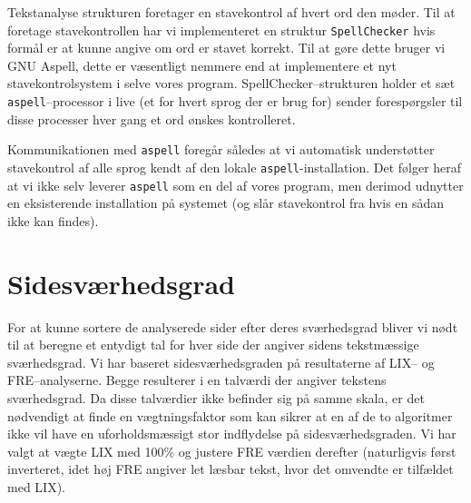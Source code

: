 \documentclass[a4paper,oneside]{memoir}
\begin{document}
Tekstanalyse strukturen foretager en stavekontrol af hvert ord den
møder. Til at foretage stavekontrollen har vi implementeret en
struktur \texttt{SpellChecker} hvis formål er at kunne angive om ord
er stavet korrekt. Til at gøre dette bruger vi GNU Aspell, dette er
væsentligt nemmere end at implementere et nyt stavekontrolsystem i
selve vores program. SpellChecker--strukturen holder et sæt
\texttt{aspell}--processor i live (et for hvert sprog der er brug for)
sender forespørgsler til disse processer hver gang et ord ønskes
kontrolleret.

Kommunikationen med \texttt{aspell} foregår således at
vi automatisk understøtter stavekontrol af alle sprog kendt af den
lokale \texttt{aspell}-installation. Det følger heraf at vi ikke selv
leverer \texttt{aspell} som en del af vores program, men derimod
udnytter en eksisterende installation på systemet (og slår
stavekontrol fra hvis en sådan ikke kan findes).

\section{Sidesværhedsgrad}
For at kunne sortere de analyserede sider efter deres sværhedsgrad
bliver vi nødt til at beregne et entydigt tal for hver side der
angiver sidens tekstmæssige sværhedsgrad. Vi har baseret
sidesværhedsgraden på resultaterne af LIX-- og FRE--analyserne. Begge
resulterer i en talværdi der angiver tekstens sværhedsgrad. Da disse
talværdier ikke befinder sig på samme skala, er det nødvendigt at
finde en vægtningsfaktor som kan sikrer at en af de to algoritmer ikke
vil have en uforholdsmæssigt stor indflydelse på
sidesværhedsgraden. Vi har valgt at vægte LIX med 100\% og justere FRE
værdien derefter (naturligvis først inverteret, idet høj FRE angiver
let læsbar tekst, hvor det omvendte er tilfældet med LIX).
\end{document}
